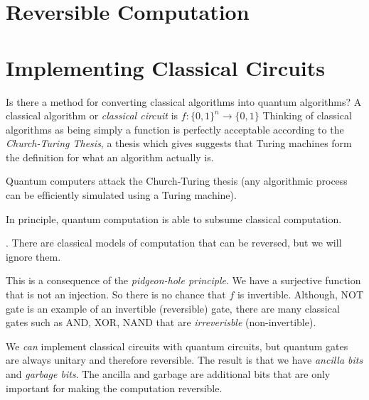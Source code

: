 \section{Reversible Computation}





\section{Implementing Classical Circuits}

Is there a method for converting classical algorithms into quantum algorithms?
A classical algorithm or \textit{classical circuit} is $f : \{0,1\}^n \rightarrow \{0,1\}$
Thinking of classical algorithms as being simply a function is perfectly acceptable 
according to the \textit{Church-Turing Thesis}, a thesis which gives 
suggests that Turing machines form the definition 
for what an algorithm actually is.

Quantum computers attack the Church-Turing thesis (any algorithmic
process can be efﬁciently simulated using a Turing
machine).


In principle, quantum computation is able to subsume classical computation.


. 
There are classical models of computation that can be reversed, but we will ignore them.



This is a consequence of the \textit{pidgeon-hole principle}. 
We have a surjective function that is not an injection. So 
there is no chance that $f$ is invertible. 
Although, NOT gate is an example of an invertible (reversible) gate,
there are many classical gates such as AND, XOR, NAND that are \textit{irreverisble} (non-invertible).

We \textit{can} implement classical circuits with quantum circuits, 
but quantum gates are always unitary and therefore reversible. 
The result is that we have \textit{ancilla bits} and \textit{garbage bits}. 
The ancilla and garbage are additional bits that are only important for 
making the computation reversible.


